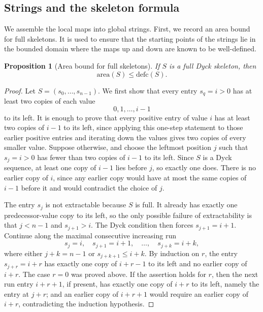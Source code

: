 \documentclass[11pt]{article}
\theoremstyle{plain}
\newtheorem{proposition}[theorem]{Proposition}
\theoremstyle{definition}
\theoremstyle{remark}
\newcommand{\area}{\mathrm{area}}
\newcommand{\defc}{\mathrm{defc}}
\begin{document}
\subsection{Strings and the skeleton formula}
\label{subsec:strings-and-formula}
We assemble the local maps into global strings.  First, we record an area bound
for full skeletons.  It is used to ensure that the starting
points of the strings lie in the bounded domain where the maps
\(\mathrm{up}\) and \(\mathrm{down}\) are known to be well-defined.
\begin{proposition}[Area bound for full skeletons]
\label{prop:area-leq-defc}
If \(S\) is a full Dyck skeleton, then
\[
  \area(S)\le \defc(S).
\]
\end{proposition}
\begin{proof}
Let \(S=(s_0,\ldots,s_{n-1})\).  We first show that every entry
\(s_q=i>0\) has at least two copies of each value
\[
  0,1,\ldots,i-1
\]
to its left.  It is enough to prove that every positive entry of value \(i\)
has at least two copies of \(i-1\) to its left, since applying this one-step
statement to those earlier positive entries and iterating down the values gives
two copies of every smaller value.
Suppose otherwise, and choose the leftmost position \(j\) such that
\(s_j=i>0\) has fewer than two copies of \(i-1\) to its left.  Since \(S\) is a
Dyck sequence, at least one copy of \(i-1\) lies before \(j\), so exactly one
does.  There is no earlier copy of \(i\), since any earlier copy would have at
most the same copies of \(i-1\) before it and would contradict the choice of
\(j\).

The entry \(s_j\) is not extractable because \(S\) is full.  It already has
exactly one predecessor-value copy to its left, so the only possible failure of
extractability is that \(j<n-1\) and \(s_{j+1}>i\).  The Dyck condition then
forces \(s_{j+1}=i+1\).  Continue along the maximal consecutive increasing run
\[
  s_j=i,\quad s_{j+1}=i+1,\quad \ldots,\quad s_{j+k}=i+k,
\]
where either \(j+k=n-1\) or \(s_{j+k+1}\le i+k\).  By induction on \(r\), the
entry \(s_{j+r}=i+r\) has exactly one copy of \(i+r-1\) to its left and no
earlier copy of \(i+r\).  The case \(r=0\) was proved above.  If the assertion
holds for \(r\), then the next run entry \(i+r+1\), if present, has exactly
one copy of \(i+r\) to its left, namely the entry at \(j+r\); and an earlier
copy of \(i+r+1\) would require an earlier copy of \(i+r\), contradicting the
induction hypothesis.


\end{proof}
\end{document}
